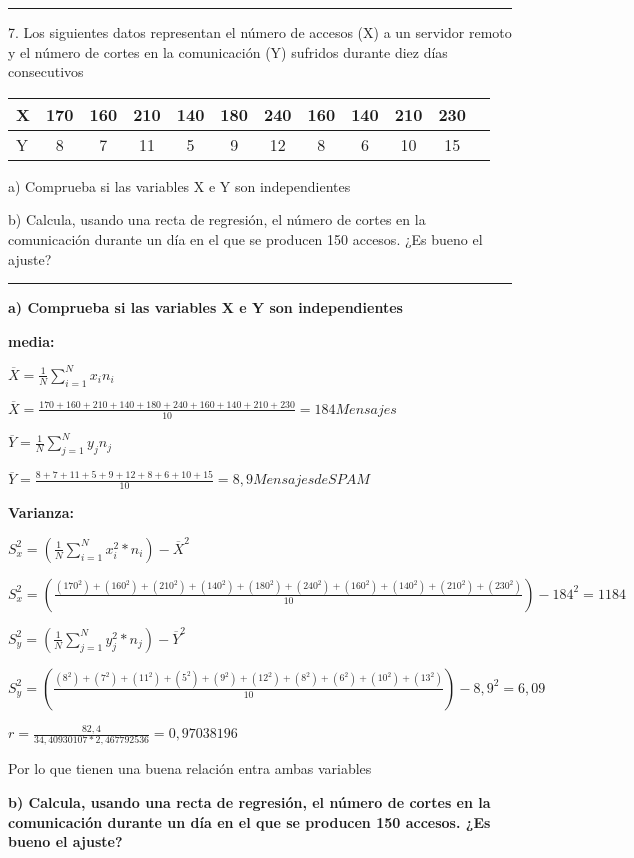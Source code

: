 \documentclass{article}
\begin{document}
\rule{119mm}{0.5mm}

7. Los siguientes datos representan el n\'umero de accesos (X) a un servidor remoto y el n\'umero de cortes en la comunicaci\'on (Y) sufridos durante diez d\'ias consecutivos

\begin{tabular}{|l|c|c|c|c|c|c|c|c|c|c|c|}
X & 170 & 160 & 210 & 140 & 180 & 240 & 160 & 140 & 210 & 230\\
\hline
Y  & 8 & 7 & 11 & 5 & 9 & 12 & 8 & 6 & 10 & 15\\
\end{tabular}

a) Comprueba si las variables X e Y son independientes

b) Calcula, usando una recta de regresi\'on, el n\'umero de cortes en la comunicaci\'on durante un d\'ia en el que se producen 150 accesos. ¿Es bueno el ajuste?

\rule{119mm}{0.2mm}

\textbf{a) Comprueba si las variables X e Y son independientes}

\textbf{media:}

\(\overline{X} = \frac{1}{N} \displaystyle\sum_{i=1}^{N} x_{i} n_{i}\)

\(\overline{X} = \frac{170 + 160 + 210 + 140 + 180 + 240 + 160 + 140 + 210 + 230}{10} = 184 Mensajes\)

\(\overline{Y} = \frac{1}{N} \displaystyle\sum_{j=1}^{N} y_{j} n_{j}\)

\(\overline{Y} = \frac{8 + 7 + 11 + 5 + 9 + 12 + 8 + 6 + 10 + 15}{10} = 8,9 Mensajes de SPAM\)

\textbf{Varianza:}

\(S_{x}^2  = (\frac{1}{N} \displaystyle\sum_{i=1}^{N} x_{i} ^2 * n_{i}) - \overline{X}^2\)

\(S_{x}^2 = (\frac{(170^2) + (160^2) + (210^2) + (140^2) + (180^2) + (240^2) + (160^2) +(140^2) +(210^2) + (230^2) }{10}) - 184^2 = 1184\)

\(S_{y}^2  = (\frac{1}{N} \displaystyle\sum_{j=1}^{N} y_{j} ^2 * n_{j}) - \overline{Y}^2\)

\(S_{y}^2 = (\frac{(8^2) + (7^2) + (11^2) + (5^2) + (9^2) + (12^2) + (8^2) + (6^2) + (10^2) + (13^2)}{10}) - 8,9^2 = 6,09\)

\(r = \frac{82,4}{34,40930107 * 2,467792536} = 0,97038196\)

Por lo que tienen una buena relaci\'on entra ambas variables

\textbf{b) Calcula, usando una recta de regresi\'on, el n\'umero de cortes en la comunicaci\'on durante un d\'ia en el que se producen 150 accesos. ¿Es bueno el ajuste?}
\end{document}
